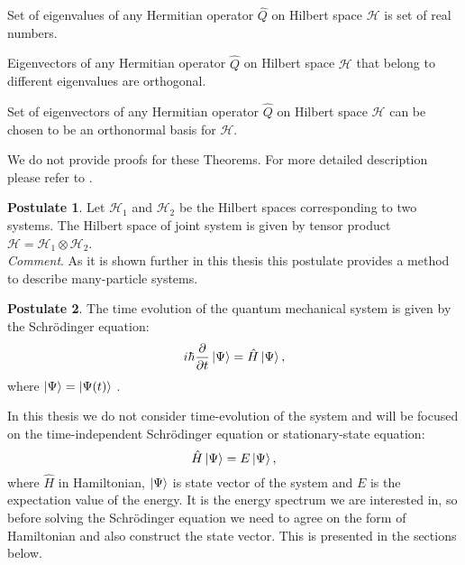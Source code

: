 \documentclass[twoside,english]{uiofysmaster}
\theoremstyle{definition}
\newtheorem{post}{Postulate}
\begin{document}
\begin{theorem}\label{theorem:eigvalHerm}
	Set of eigenvalues of any Hermitian operator $\hat{Q}$ on Hilbert space $\mathscr{H}$ is set of real numbers. 
\end{theorem}

\begin{theorem}\label{theorem:eigvecHerm}
	Eigenvectors of any Hermitian operator $\hat{Q}$ on Hilbert space $\mathscr{H}$ that belong to different eigenvalues are orthogonal. 
\end{theorem}

\begin{theorem}\label{theorem:orhtonormalbasis}
Set of eigenvectors of any Hermitian operator $\hat{Q}$ on Hilbert space $\mathscr{H}$ can be chosen to be an orthonormal basis for $\mathscr{H}$.
\end{theorem}
We do not provide proofs for these Theorems. For more detailed description please refer to \cite{aulettaQuantumMechanics2009}.
\begin{post}
	Let $\mathscr{H}_1$ and $\mathscr{H}_2$ be the Hilbert spaces corresponding to two systems. The Hilbert space of joint system is given by tensor product $\mathscr{H}=\mathscr{H}_1 \otimes \mathscr{H}_2$.\\
\textit{Comment}. As it is shown further in this thesis this postulate provides a method to describe many-particle systems. 
\end{post}
\begin{post}
The time evolution of the quantum mechanical system is given by the Schr\"{o}dinger equation:
\begin{equation}\label{eq:basic_schrod}
 i \hbar \frac{\partial }{ \partial t}\ket{\Psi} = \hat{H}\ket{\Psi},
\end{equation}
where $\ket{\Psi}=\ket{\Psi(t)}$ .
\end{post}
In this thesis we do not consider time-evolution of the system and will be focused on the time-independent Schr\"{o}dinger equation or stationary-state equation:
\begin{equation}
\hat{H}\ket{\Psi} = E \ket{\Psi},
\end{equation}
where $\hat{H}$ in Hamiltonian, $\ket{\Psi}$ is state vector of the system and $E$ is the expectation value of the energy. It is the energy spectrum we are interested in, so before solving the Schr\"{o}dinger equation we need to agree on the form of Hamiltonian and also construct the state vector. This is presented in the sections below.
\end{document}
